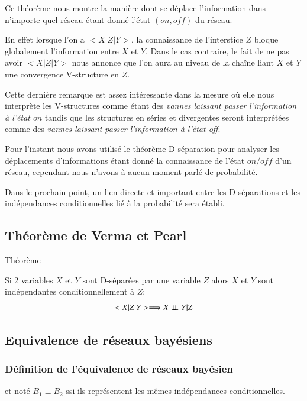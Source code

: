 \documentclass[a4paper]{article}
\begin{document}
Ce théorème nous montre la manière dont se déplace l'information dans n'importe quel réseau étant donné l'état $(on , off)$ du réseau.

En effet lorsque l'on a $<X|Z|Y>$,
la connaissance de l'interstice $Z$  bloque globalement l'information entre  $X$ et $Y$.
Dans le cas contraire,
le fait de ne pas avoir $<X|Z|Y>$ nous annonce que l'on aura au niveau de la chaîne liant $X$ et $Y$ une convergence V-structure en $Z$.

Cette dernière remarque est assez intéressante dans la mesure où elle nous interprète les V-structures comme étant des \textit{vannes laissant passer l'information à l'état $on$}
tandis que les structures en séries et divergentes seront interprétées comme des \textit{vannes laissant passer l'information à l'état off}.

Pour l'instant nous avons utilisé le théorème D-séparation pour analyser les déplacements d'informations étant donné la connaissance de l'état $on/off$ d'un réseau, cependant  nous n'avons à aucun moment parlé de probabilité.

Dans le prochain point,
un lien directe et important entre les D-séparations  et les indépendances conditionnelles lié à la probabilité sera établi.

\subsection{Théorème de Verma et Pearl}
\begin{theorem}{Théorème}

Si 2 variables $X$ et $Y$ sont D-séparées par une variable $Z$ alors $X$ et $Y$ sont indépendantes conditionnellement à $Z$:
 $$<X|Z|Y>\Longrightarrow X \perp\!\!\!\perp Y|Z$$
\end{theorem}



\newpage
\subsection{Equivalence de réseaux bayésiens}

\subsubsection{Définition de l'équivalence de réseaux bayésien}

 et noté $B_1\equiv B_2$  ssi ils représentent les mêmes indépendances conditionnelles.
\end{document}
